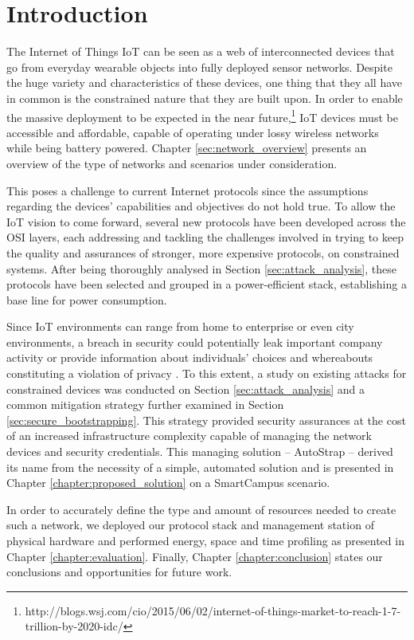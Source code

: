 
\chapter{Introduction}
\label{chapter:introduction}
The Internet of Things \gls{IoT} can be seen as a web of interconnected devices that go from everyday wearable objects into fully deployed sensor networks. Despite the huge variety and characteristics of these devices, one thing that they all have in common is the constrained nature that they are built upon. In order to enable the massive deployment to be expected in the near future,\footnote{http://blogs.wsj.com/cio/2015/06/02/internet-of-things-market-to-reach-1-7-trillion-by-2020-idc/} \gls{IoT} devices must be accessible and affordable, capable of operating under lossy wireless networks while being battery powered. Chapter \ref{sec:network_overview} presents an overview of the type of networks and scenarios under consideration.

	This poses a challenge to current Internet protocols since the assumptions regarding the devices' capabilities and objectives do not hold true. To allow the \gls{IoT} vision to come forward, several new protocols have been developed across the OSI layers, each addressing and tackling the challenges involved in trying to keep the quality and assurances of stronger, more expensive protocols, on constrained systems. After being thoroughly analysed in Section \ref{sec:attack_analysis}, these protocols have been selected and grouped in a power-efficient stack, establishing a base line for power consumption. 
	
	Since \gls{IoT} environments can range from home to enterprise or even city environments, a breach in security could potentially leak important company activity or provide information about individuals' choices and whereabouts constituting a violation of privacy \cite{Ukil2015}. To this extent, a study on existing attacks for constrained devices was conducted on Section \ref{sec:attack_analysis} and a common mitigation strategy further examined in Section \ref{sec:secure_bootstrapping}. This strategy provided security assurances at the cost of an increased infrastructure complexity capable of managing the network devices and security credentials. This managing solution -- AutoStrap -- derived its name from the necessity of a simple, automated solution and is presented in Chapter \ref{chapter:proposed_solution} on a SmartCampus scenario. 
	
	In order to accurately define the type and amount of resources needed to create such a network, we deployed our protocol stack and management station of physical hardware and performed energy, space and time profiling as presented in Chapter \ref{chapter:evaluation}. Finally, Chapter \ref{chapter:conclusion} states our conclusions and opportunities for future work.